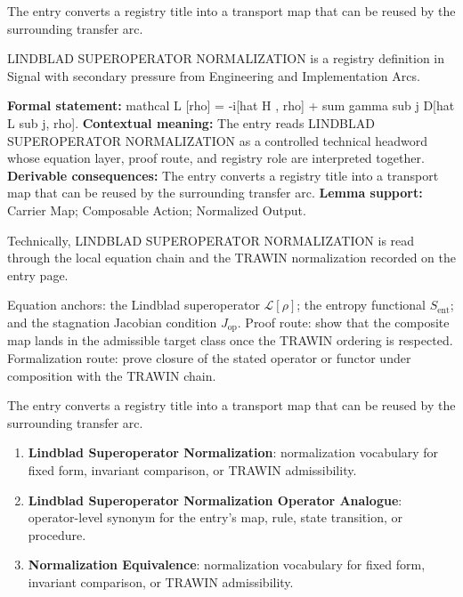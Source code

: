 The entry converts a registry title into a transport map that can be reused by the surrounding transfer arc.
\clearpage


\begingroup\small
{}
LINDBLAD SUPEROPERATOR NORMALIZATION is a registry definition in Signal with secondary pressure from Engineering and Implementation Arcs.

\begingroup\footnotesize\setlength{\emergencystretch}{3em}\sloppy
\textbf{Formal statement:} mathcal L [rho] = -i[hat H , rho] + sum gamma sub j D[hat L sub j, rho]. \textbf{Contextual meaning:} The entry reads LINDBLAD SUPEROPERATOR NORMALIZATION as a controlled technical headword whose equation layer, proof route, and registry role are interpreted together. \textbf{Derivable consequences:} The entry converts a registry title into a transport map that can be reused by the surrounding transfer arc. \textbf{Lemma support:} Carrier Map; Composable Action; Normalized Output.\par
\endgroup

Technically, LINDBLAD SUPEROPERATOR NORMALIZATION is read through the local equation chain and the TRAWIN normalization recorded on the entry page.

Equation anchors: the Lindblad superoperator \(\mathcal{L}[\rho]\); the entropy functional \(S_{\mathrm{ent}}\); and the stagnation Jacobian condition \(J_{\mathrm{op}}\). Proof route: show that the composite map lands in the admissible target class once the TRAWIN ordering is respected. Formalization route: prove closure of the stated operator or functor under composition with the TRAWIN chain.

The entry converts a registry title into a transport map that can be reused by the surrounding transfer arc.
\endgroup

\begin{enumerate}[leftmargin=1.6em,itemsep=6pt,topsep=4pt]
\item \textbf{Lindblad Superoperator Normalization}: normalization vocabulary for fixed form, invariant comparison, or TRAWIN admissibility.
\item \textbf{Lindblad Superoperator Normalization Operator Analogue}: operator-level synonym for the entry's map, rule, state transition, or procedure.
\item \textbf{Normalization Equivalence}: normalization vocabulary for fixed form, invariant comparison, or TRAWIN admissibility.
\end{enumerate}

